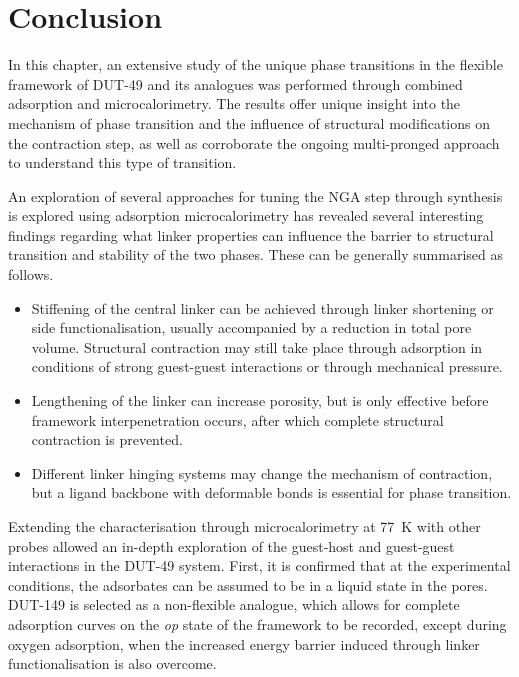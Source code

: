 
\section{Conclusion}

In this chapter, an extensive study of the unique phase transitions
in the flexible framework of DUT-49 and its analogues was performed
through combined adsorption and microcalorimetry.
The results offer unique insight into the mechanism of phase transition
and the influence of structural modifications on the contraction step,
as well as corroborate the ongoing multi-pronged approach to understand
this type of transition.

An exploration of several approaches for tuning the NGA step through 
synthesis is explored using adsorption microcalorimetry has revealed
several interesting findings regarding what linker properties can
influence the barrier to structural transition and stability of the
two phases. These can be generally summarised as follows.

\begin{itemize}
    \item Stiffening of the central linker can be achieved through 
    linker shortening or side functionalisation, usually accompanied 
    by a reduction in total pore volume. Structural contraction may 
    still take place through adsorption in conditions of strong 
    guest-guest interactions or through mechanical pressure.
    \item Lengthening of the linker can increase porosity,
    but is only effective before framework interpenetration 
    occurs, after which complete structural contraction is 
    prevented.
    \item Different linker hinging systems may change 
    the mechanism of contraction, but a ligand backbone with 
    deformable bonds is essential for phase transition.
\end{itemize}

Extending the characterisation through microcalorimetry at \SI{77}{\kelvin}
with other probes allowed an in-depth exploration of the guest-host and 
guest-guest interactions in the DUT-49 system. First, it is confirmed 
that at the experimental conditions, the adsorbates can be assumed to 
be in a liquid state in the pores. DUT-149 is selected as a non-flexible 
analogue, which allows for complete adsorption curves on the \textit{op}
state of the framework to be recorded, except during oxygen adsorption,
when the increased energy barrier induced through linker functionalisation
is also overcome.

